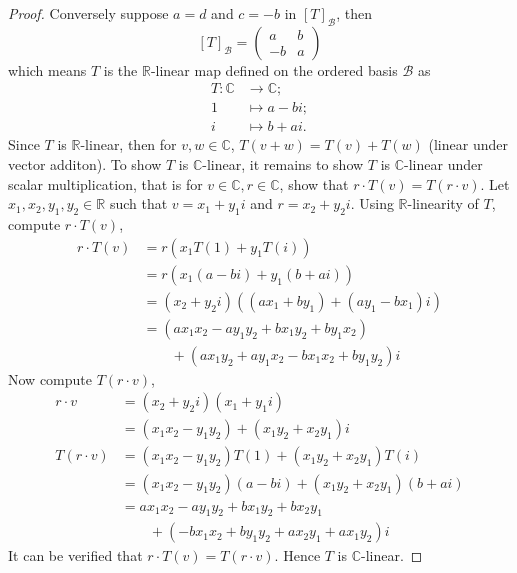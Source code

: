 \documentclass{article}
\theoremstyle{definition}
\numberwithin{lemma}{problem}
\numberwithin{equation}{problem}
\newcommand{\R}{\mathbb{R}}
\newcommand{\C}{\mathbb{C}}
\newcommand{\B}{\mathcal{B}}
\begin{document}
\begin{proof}
    Conversely suppose $a = d$ and $c = -b$ in $[T]_\B$, then
    \[ [T]_\B = \begin{pmatrix} a & b\\ -b & a \end{pmatrix} \]
    which means $T$ is the $\R$-linear map defined on the ordered basis $\B$ as
    \begin{align*}
        T: \C &\to \C;      \\
        1 &\mapsto a - bi;  \\
        i &\mapsto b + ai.
    \end{align*}
    Since $T$ is $\R$-linear, then for $v,w\in \C$, $T(v+w) = T(v) + T(w)$ (linear under vector additon).
    To show $T$ is $\C$-linear, it remains to show $T$ is $\C$-linear under scalar multiplication,
    that is for $v\in \C, r\in \C$, show that $r\cdot T(v) = T(r\cdot v)$.
    Let $x_1, x_2, y_1, y_2 \in \R$ such that $v = x_1 + y_1i$ and $r = x_2 + y_2i$.
    Using $\R$-linearity of $T$, compute $r\cdot T(v)$,
    \begin{align*}
        r\cdot T(v) &= r\left( x_1 T(1) + y_1 T(i) \right)\\
        &= r\left( x_1(a-bi) + y_1(b+ai) \right)\\
        &= (x_2 + y_2i)\left( (ax_1 +by_1) + (ay_1 - bx_1)i \right)\\
        &= (ax_1x_2 - ay_1y_2 + bx_1y_2 + by_1x_2)  \\
        &\qquad + (ax_1y_2 + ay_1x_2 - bx_1 x_2 + by_1y_2)i
    \end{align*}
    Now compute $T(r\cdot v)$,
    \begin{align*}
        r\cdot v &= (x_2 + y_2i)(x_1 + y_1i)    \\
        &= (x_1x_2 - y_1y_2) + (x_1y_2 + x_2y_1)i\\
        T(r\cdot v) &= (x_1x_2 - y_1y_2)T(1) + (x_1y_2 + x_2y_1)T(i)\\
        &= (x_1x_2 - y_1y_2)(a-bi) + (x_1y_2 + x_2y_1)(b+ai)\\
        &= ax_1x_2 - ay_1y_2 + bx_1y_2 + bx_2y_1 \\
        &\qquad + (-bx_1x_2 + by_1y_2 + ax_2y_1 + ax_1y_2)i
    \end{align*}
    It can be verified that $r\cdot T(v) = T(r\cdot v)$.
    Hence $T$ is $\C$-linear.
\end{proof}
\end{document}
